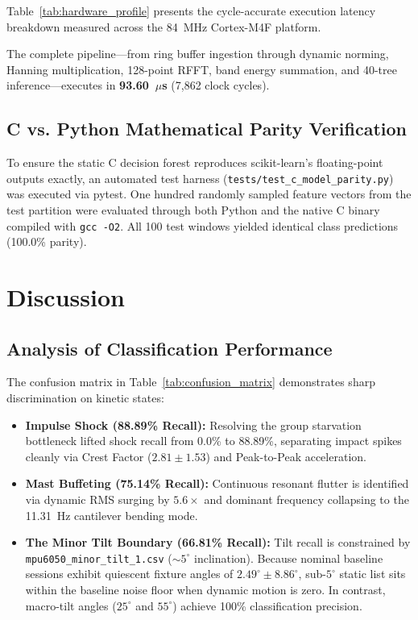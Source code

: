 \documentclass[twocolumn]{article}
\begin{document}
Table~\ref{tab:hardware_profile} presents the cycle-accurate execution latency breakdown measured across the 84~MHz Cortex-M4F platform.



The complete pipeline---from ring buffer ingestion through dynamic norming, Hanning multiplication, 128-point RFFT, band energy summation, and 40-tree inference---executes in \textbf{93.60~$\mu$s} (7,862 clock cycles).

\subsection{C vs. Python Mathematical Parity Verification}
To ensure the static C decision forest reproduces scikit-learn's floating-point outputs exactly, an automated test harness (\texttt{tests/test\_c\_model\_parity.py}) was executed via pytest. One hundred randomly sampled feature vectors from the test partition were evaluated through both Python and the native C binary compiled with \texttt{gcc -O2}. All 100 test windows yielded identical class predictions (100.0\% parity).

\section{Discussion}

\subsection{Analysis of Classification Performance}
The confusion matrix in Table~\ref{tab:confusion_matrix} demonstrates sharp discrimination on kinetic states:
\begin{itemize}[noitemsep]
    \item \textbf{Impulse Shock (88.89\% Recall):} Resolving the group starvation bottleneck lifted shock recall from 0.0\% to 88.89\%, separating impact spikes cleanly via Crest Factor ($2.81 \pm 1.53$) and Peak-to-Peak acceleration.
    \item \textbf{Mast Buffeting (75.14\% Recall):} Continuous resonant flutter is identified via dynamic RMS surging by $5.6\times$ and dominant frequency collapsing to the 11.31~Hz cantilever bending mode.
    \item \textbf{The Minor Tilt Boundary (66.81\% Recall):} Tilt recall is constrained by \texttt{mpu6050\_minor\_tilt\_1.csv} ($\sim 5^\circ$ inclination). Because nominal baseline sessions exhibit quiescent fixture angles of $2.49^\circ \pm 8.86^\circ$, sub-$5^\circ$ static list sits within the baseline noise floor when dynamic motion is zero. In contrast, macro-tilt angles ($25^\circ$ and $55^\circ$) achieve 100\% classification precision.
\end{itemize}
\end{document}
